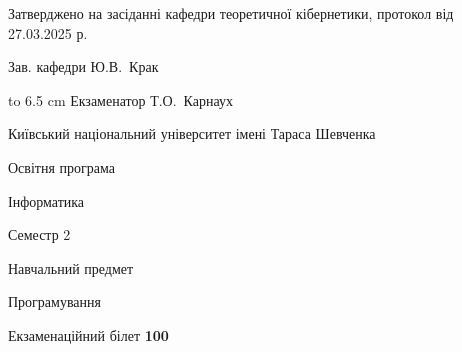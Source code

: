 \documentclass[12pt, ukrainian]{article}
\begin{document}
{\smallskip\smallskip \begin {scriptsize} Затверджено на засіданні кафедри теоретичної кібернетики, протокол   від   27.03.2025 р.\par\smallskip\smallskip\smallskip\smallskip
{\parbox {6.5 cm} {Зав. кафедри \dotfill Ю.В.~Крак}}\hspace {0.7cm} {\hbox to 6.5 cm { Екзаменатор \dotfill Т.О.~Карнаух}} \end{scriptsize}}
\newpage
{{\begin {scriptsize}\par
{ \center  Київський національний університет імені Тараса Шевченка \par}
{\parbox {5 cm}{Освітня програма \hfill}{\parbox {7 cm}{Інформатика\hfill}}\parbox {6 cm}{\hfill Семестр 2}}\par
{\parbox {5 cm} {Навчальний предмет \hfill}\parbox {7 cm}{Програмування \hfill}\parbox {6cm}{\hfill}\par}\vspace{-15pt} \end{scriptsize}}{\center Екзаменаційний білет \No \textbf { 100 }\par}}
\end{document}
